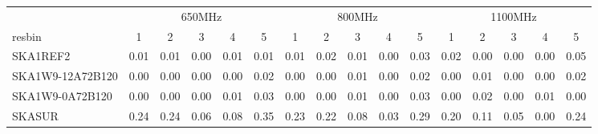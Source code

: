 \begin{table}[!htp]
{{\begin{tabular}{|lccccc||ccccc||ccccc|}
 \tabularnewline \cline{2-16} \multicolumn{1}{c}{ } & \multicolumn{5}{|c}{650MHz}  & \multicolumn{5}{c}{800MHz}  & \multicolumn{5}{c|}{1100MHz} \tabularnewline \cline{1-16} 
 resbin  &1 & 2 & 3 & 4 & 5 & 1 & 2 & 3 & 4 & 5 & 1 & 2 & 3 & 4 & 5 \tabularnewline \hline
SKA1REF2 & 0.01 \cellcolor{blue!19.75} & 0.01 \cellcolor{red!19.75} & 0.00 \cellcolor{green!18.00} & 0.01 \cellcolor{orange!23.25} & 0.01 \cellcolor{purple!18.00} & 0.01 \cellcolor{blue!19.83} & 0.02 \cellcolor{red!21.82} & 0.01 \cellcolor{green!18.00} & 0.00 \cellcolor{orange!18.00} & 0.03 \cellcolor{purple!19.56} & 0.02 \cellcolor{blue!22.20} & 0.00 \cellcolor{red!18.00} & 0.00 \cellcolor{green!18.00} & 0.00 \cellcolor{orange!18.00} & 0.05 \cellcolor{purple!26.75}\\ \hline 
SKA1W9-12A72B120 & 0.00 \cellcolor{blue!18.00} & 0.00 \cellcolor{red!18.00} & 0.00 \cellcolor{green!18.00} & 0.00 \cellcolor{orange!18.00} & 0.02 \cellcolor{purple!19.24} & 0.00 \cellcolor{blue!18.00} & 0.00 \cellcolor{red!18.00} & 0.01 \cellcolor{green!18.00} & 0.00 \cellcolor{orange!18.00} & 0.02 \cellcolor{purple!18.00} & 0.00 \cellcolor{blue!18.00} & 0.01 \cellcolor{red!21.82} & 0.00 \cellcolor{green!18.00} & 0.00 \cellcolor{orange!18.00} & 0.02 \cellcolor{purple!21.50}\\ \hline 
SKA1W9-0A72B120 & 0.00 \cellcolor{blue!18.00} & 0.00 \cellcolor{red!18.00} & 0.00 \cellcolor{green!18.00} & 0.01 \cellcolor{orange!23.25} & 0.03 \cellcolor{purple!20.47} & 0.00 \cellcolor{blue!18.00} & 0.00 \cellcolor{red!18.00} & 0.01 \cellcolor{green!18.00} & 0.00 \cellcolor{orange!18.00} & 0.03 \cellcolor{purple!19.56} & 0.00 \cellcolor{blue!18.00} & 0.02 \cellcolor{red!25.64} & 0.00 \cellcolor{green!18.00} & 0.01 \cellcolor{orange!60.00} & 0.00 \cellcolor{purple!18.00}\\ \hline 
SKASUR & 0.24 \cellcolor{blue!60.00} & 0.24 \cellcolor{red!60.00} & 0.06 \cellcolor{green!60.00} & 0.08 \cellcolor{orange!60.00} & 0.35 \cellcolor{purple!60.00} & 0.23 \cellcolor{blue!60.00} & 0.22 \cellcolor{red!60.00} & 0.08 \cellcolor{green!60.00} & 0.03 \cellcolor{orange!60.00} & 0.29 \cellcolor{purple!60.00} & 0.20 \cellcolor{blue!60.00} & 0.11 \cellcolor{red!60.00} & 0.05 \cellcolor{green!60.00} & 0.00 \cellcolor{orange!18.00} & 0.24 \cellcolor{purple!60.00}\tabularnewline \hline 
\end{tabular}}\hfil 
{}}
\end{table}
